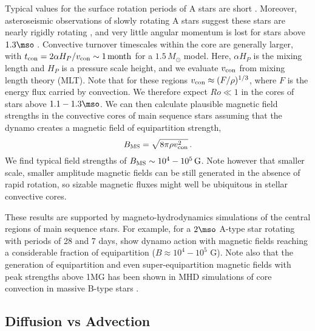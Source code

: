 Typical values for the surface rotation periods of A stars are short \citep[about 1 day, see e.g.]{Zorec_2012}. 
Moreover, asteroseismic observations of slowly rotating A stars suggest these stars are nearly rigidly rotating \cite{Kurtz_2014}, and very little angular momentum is lost for stars above $1.3\mso$ \citep[Kraft break, see e.g.][]{1967ApJ...150..551K,2013ApJ...776...67V}. 
Convective turnover timescales within the core are generally larger, with $t_{\rm con} = 2 \alpha H_P/v_{\rm con} \sim 1 \, {\rm month}$ for a $1.5 \, M_\odot$ model. Here, $\alpha H_P$ is the mixing length and $H_P$ is a pressure scale height, and we evaluate $v_{\rm con}$ from mixing length theory (MLT). Note that for these regions $v_{\rm con} \approx (F/\rho)^{1/3}$, where $F$ is the energy flux carried by convection.
We therefore expect $Ro \ll 1$ in the cores of stars above $1.1-1.3\mso$. 
We can then calculate plausible magnetic field strengths in the convective cores of main sequence stars assuming that the dynamo creates a magnetic field of equipartition strength,
\begin{equation}
\label{eqn:Beq}
B_{\rm MS} = \sqrt{ 8 \pi \rho v_{\rm con}^2} \, .
\end{equation}
We find typical field strengths of $B_{\rm MS} \sim 10^4 - 10^5 \, {\rm G}$. Note however that smaller scale, smaller amplitude magnetic fields can be still generated in the absence of rapid rotation, so sizable magnetic fluxes might well be ubiquitous in stellar convective cores. 

These results are supported by magneto-hydrodynamics simulations of the central regions of main sequence stars. For example, for a $2\mso$ A-type star rotating with periods of 28 and 7 days, \citet{Brun_2005}
show dynamo action with magnetic fields reaching a considerable fraction of equipartition ($B \approx 10^4-10^5$ G). 
Note also that the generation of equipartition and even super-equipartition magnetic fields with peak strengths above 1MG has been shown in MHD simulations of core convection in massive B-type stars \cite{2013PhDT.......388A}.




\subsection{Diffusion vs Advection}
\label{time}

